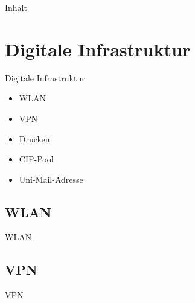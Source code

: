 




\begin{frame}[fragile]
    \maketitle
\end{frame}

\begin{frame}[fragile]{Inhalt}
    \tableofcontents[hideallsubsections]
\end{frame}


\section{Digitale Infrastruktur}
\begin{frame}{Digitale Infrastruktur}
    \large
    \begin{itemize}
        \item{WLAN}
        \item{VPN}
        \item{Drucken}
        \item{CIP-Pool}
        \item{Uni-Mail-Adresse}
    \end{itemize}
\end{frame}


\subsection{WLAN}
\begin{frame}{WLAN}
\end{frame}


\subsection{VPN}
\begin{frame}{VPN}
\end{frame}


